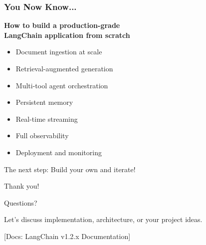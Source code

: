 \documentclass[aspectratio=169,11pt]{beamer}
\newcommand{\docref}[1]{{\scriptsize\color{docgray}[Docs: #1]}}
\begin{document}
\begin{frame}
  \frametitle{You Now Know...}

  \begin{center}
    {\Large \textbf{How to build a production-grade}} \\
    \vspace{0.3cm}
    {\Large \textbf{LangChain application from scratch}}
    \vspace{0.6cm}

    \begin{itemize}
      \item Document ingestion at scale
      \item Retrieval-augmented generation
      \item Multi-tool agent orchestration
      \item Persistent memory
      \item Real-time streaming
      \item Full observability
      \item Deployment and monitoring
    \end{itemize}

    \vspace{0.6cm}
    {\small The next step: Build your own and iterate!}
  \end{center}
\end{frame}

\begin{frame}[plain]
  \begin{center}
    \vspace{2cm}
    {\Huge Thank you!}
    \vspace{0.8cm}

    {\Large Questions?}
    \vspace{0.8cm}

    Let's discuss implementation, architecture, or your project ideas.

    \vspace{1.2cm}
    \docref{LangChain v1.2.x Documentation}
  \end{center}
\end{frame}
\end{document}
